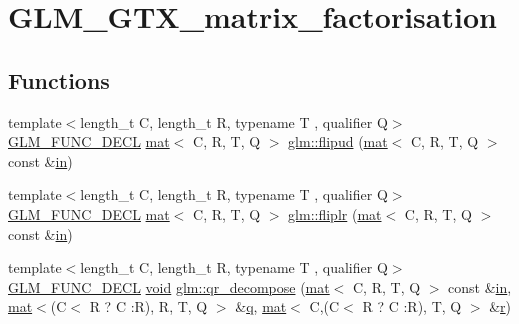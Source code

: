 \hypertarget{group__gtx__matrix__factorisation}{}\section{G\+L\+M\+\_\+\+G\+T\+X\+\_\+matrix\+\_\+factorisation}
\label{group__gtx__matrix__factorisation}
\subsection*{Functions}
\begin{DoxyCompactItemize}
\item 
{\footnotesize template$<$length\+\_\+t C, length\+\_\+t R, typename T , qualifier Q$>$ }\\\hyperlink{setup_8hpp_ab2d052de21a70539923e9bcbf6e83a51}{G\+L\+M\+\_\+\+F\+U\+N\+C\+\_\+\+D\+E\+CL} \hyperlink{structglm_1_1mat}{mat}$<$ C, R, T, Q $>$ \hyperlink{group__gtx__matrix__factorisation_ga85003371f0ba97380dd25e8905de1870}{glm\+::flipud} (\hyperlink{structglm_1_1mat}{mat}$<$ C, R, T, Q $>$ const \&\hyperlink{_s_d_l__opengl__glext_8h_a83ad0ee7f1e06b59c90271716e689080}{in})
\item 
{\footnotesize template$<$length\+\_\+t C, length\+\_\+t R, typename T , qualifier Q$>$ }\\\hyperlink{setup_8hpp_ab2d052de21a70539923e9bcbf6e83a51}{G\+L\+M\+\_\+\+F\+U\+N\+C\+\_\+\+D\+E\+CL} \hyperlink{structglm_1_1mat}{mat}$<$ C, R, T, Q $>$ \hyperlink{group__gtx__matrix__factorisation_gaf39f4e5f78eb29c1a90277d45b9b3feb}{glm\+::fliplr} (\hyperlink{structglm_1_1mat}{mat}$<$ C, R, T, Q $>$ const \&\hyperlink{_s_d_l__opengl__glext_8h_a83ad0ee7f1e06b59c90271716e689080}{in})
\item 
{\footnotesize template$<$length\+\_\+t C, length\+\_\+t R, typename T , qualifier Q$>$ }\\\hyperlink{setup_8hpp_ab2d052de21a70539923e9bcbf6e83a51}{G\+L\+M\+\_\+\+F\+U\+N\+C\+\_\+\+D\+E\+CL} \hyperlink{_s_d_l__opengles2__gl2ext_8h_ae5d8fa23ad07c48bb609509eae494c95}{void} \hyperlink{group__gtx__matrix__factorisation_ga77022dca1aa38add548f9f56a9f8071a}{glm\+::qr\+\_\+decompose} (\hyperlink{structglm_1_1mat}{mat}$<$ C, R, T, Q $>$ const \&\hyperlink{_s_d_l__opengl__glext_8h_a83ad0ee7f1e06b59c90271716e689080}{in}, \hyperlink{structglm_1_1mat}{mat}$<$(C$<$ R ? C \+:R), R, T, Q $>$ \&\hyperlink{_s_d_l__opengl_8h_a8fc1e7b9baaae687804c7eed46ca09c6}{q}, \hyperlink{structglm_1_1mat}{mat}$<$ C,(C$<$ R ? C \+:R), T, Q $>$ \&\hyperlink{_s_d_l__opengl_8h_a42ce7cdc612e53abee15043f80220d97}{r})

\end{DoxyCompactItemize}
